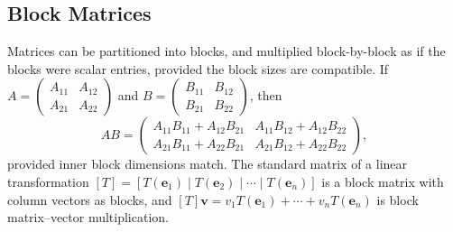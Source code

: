 \subsection*{Block Matrices}

\begin{remark*}
Matrices can be partitioned into blocks, and multiplied block-by-block
as if the blocks were scalar entries, provided the block sizes are
compatible.
If $A = \begin{pmatrix} A_{11} & A_{12} \\ A_{21} & A_{22} \end{pmatrix}$
and $B = \begin{pmatrix} B_{11} & B_{12} \\ B_{21} & B_{22} \end{pmatrix}$,
then
\[
  AB = \begin{pmatrix}
    A_{11}B_{11} + A_{12}B_{21} & A_{11}B_{12} + A_{12}B_{22} \\
    A_{21}B_{11} + A_{22}B_{21} & A_{21}B_{12} + A_{22}B_{22}
  \end{pmatrix},
\]
provided inner block dimensions match.
The standard matrix of a linear transformation $[T] = [T(\mathbf{e}_1) \mid T(\mathbf{e}_2) \mid \cdots \mid T(\mathbf{e}_n)]$
is a block matrix with column vectors as blocks, and
$[T]\mathbf{v} = v_1 T(\mathbf{e}_1) + \cdots + v_n T(\mathbf{e}_n)$
is block matrix--vector multiplication.
\end{remark*}
